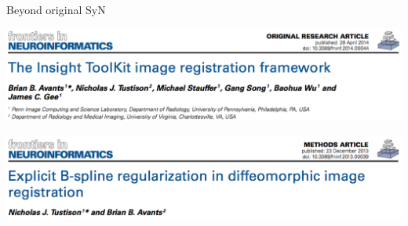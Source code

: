 \documentclass[ignorenonframetext,]{beamer}
\begin{document}
\begin{frame}{Beyond original SyN}

\small

\includegraphics{./Figs/Frontiers_ITK.png}

\includegraphics{./Figs/Frontiers_BSplineSyN.png}

\end{frame}
\end{document}
